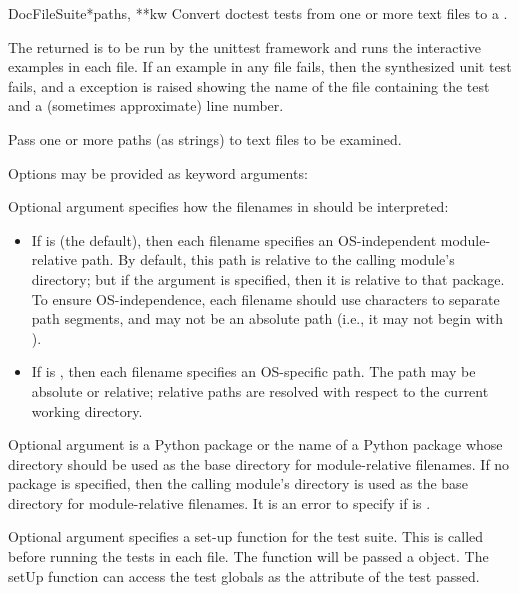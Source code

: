 \begin{funcdesc}{DocFileSuite}{*paths, **kw}
  Convert doctest tests from one or more text files to a
  .

  The returned  is to be run by the unittest
  framework and runs the interactive examples in each file.  If an
  example in any file fails, then the synthesized unit test fails, and
  a  exception is raised showing the
  name of the file containing the test and a (sometimes approximate)
  line number.

  Pass one or more paths (as strings) to text files to be examined.

  Options may be provided as keyword arguments:

  Optional argument  specifies how
  the filenames in  should be interpreted:

  \begin{itemize}
  \item If  is  (the default), then
        each filename specifies an OS-independent module-relative
        path.  By default, this path is relative to the calling
        module's directory; but if the  argument is
        specified, then it is relative to that package.  To ensure
        OS-independence, each filename should use \code{/} characters
        to separate path segments, and may not be an absolute path
        (i.e., it may not begin with \code{/}).
  \item If  is , then each filename
        specifies an OS-specific path.  The path may be absolute or
        relative; relative paths are resolved with respect to the
        current working directory.
  \end{itemize}

  Optional argument  is a Python package or the name
  of a Python package whose directory should be used as the base
  directory for module-relative filenames.  If no package is
  specified, then the calling module's directory is used as the base
  directory for module-relative filenames.  It is an error to specify
   if  is .

  Optional argument  specifies a set-up function for
  the test suite.  This is called before running the tests in each
  file.  The  function will be passed a 
  object.  The setUp function can access the test globals as the
   attribute of the test passed.


\end{funcdesc}
